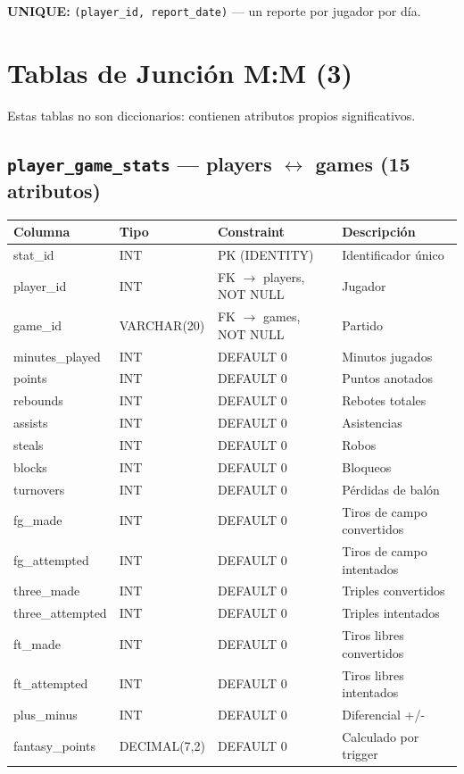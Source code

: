 \documentclass[12pt,a4paper]{article}
\begin{document}
\textbf{UNIQUE:} \texttt{(player\_id, report\_date)} --- un reporte por jugador por d\'ia.

\section{Tablas de Junci\'on M:M (3)}

Estas tablas no son diccionarios: contienen atributos propios significativos.

\subsection{\texttt{player\_game\_stats} --- players $\leftrightarrow$ games (15 atributos)}
\begin{tabular}{>{\ttfamily\small}l l l p{4.5cm}}
\toprule
\normalfont\textbf{Columna} & \textbf{Tipo} & \textbf{Constraint} & \textbf{Descripci\'on} \\
\midrule
stat\_id & INT & PK (IDENTITY) & Identificador \'unico \\
player\_id & INT & FK $\to$ players, NOT NULL & Jugador \\
game\_id & VARCHAR(20) & FK $\to$ games, NOT NULL & Partido \\
minutes\_played & INT & DEFAULT 0 & Minutos jugados \\
points & INT & DEFAULT 0 & Puntos anotados \\
rebounds & INT & DEFAULT 0 & Rebotes totales \\
assists & INT & DEFAULT 0 & Asistencias \\
steals & INT & DEFAULT 0 & Robos \\
blocks & INT & DEFAULT 0 & Bloqueos \\
turnovers & INT & DEFAULT 0 & P\'erdidas de bal\'on \\
fg\_made & INT & DEFAULT 0 & Tiros de campo convertidos \\
fg\_attempted & INT & DEFAULT 0 & Tiros de campo intentados \\
three\_made & INT & DEFAULT 0 & Triples convertidos \\
three\_attempted & INT & DEFAULT 0 & Triples intentados \\
ft\_made & INT & DEFAULT 0 & Tiros libres convertidos \\
ft\_attempted & INT & DEFAULT 0 & Tiros libres intentados \\
plus\_minus & INT & DEFAULT 0 & Diferencial +/- \\
fantasy\_points & DECIMAL(7,2) & DEFAULT 0 & Calculado por trigger \\
\bottomrule
\end{tabular}
\end{document}
